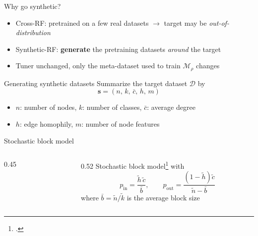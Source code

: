 \documentclass[10pt, aspectratio=169]{beamer}
\begin{document}
\begin{frame}{Why go synthetic?}
	\begin{itemize}
		\item Cross-RF: pretrained on a few real datasets \( \rightarrow \) target may be \textit{out-of-distribution}
		\item<2-> Synthetic-RF: \textbf{generate} the pretraining datasets \textit{around} the target
		\item<2-> Tuner unchanged, only the meta-dataset used to train \( \mathcal{M}_\rho \) changes
	\end{itemize}
	\vspace{1em}
	\centering
	
\end{frame}

\begin{frame}{Generating synthetic datasets}
	Summarize the target dataset \( \mathcal{D} \) by
	\[
		\boldsymbol{s} = \left( n, \, k, \, \bar{c}, \, h, \, m \right)
	\]
	\begin{itemize}
		\item \( n \): number of nodes, \( k \): number of classes, \( \bar{c} \): average degree
		\item \( h \): edge homophily, \( m \): number of node features
	\end{itemize}
	\vspace{1em}
\end{frame}

\begin{frame}{Stochastic block model}
	\begin{columns}[c,onlytextwidth]
		\begin{column}{0.45\textwidth}
			\centering
			
		\end{column}
		\begin{column}{0.52\textwidth}
			Stochastic block model\footcite{holland_stochastic_1983} with
			\[
				p_\text{in} = \frac{\tilde{h} \, \tilde{c}}{\bar{b}}, \qquad p_\text{out} = \frac{\left( 1 - \tilde{h} \right) \tilde{c}}{\tilde{n} - \bar{b}}
			\]
			where \( \bar{b} = \tilde{n} / \tilde{k} \) is the average block size

			\vspace{1em}
		\end{column}
	\end{columns}
\end{frame}
\end{document}
